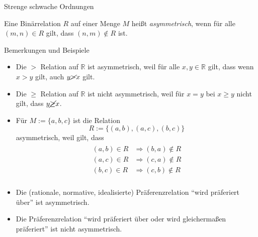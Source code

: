 \documentclass[
  8pt,
  ignorenonframetext,
]{beamer}
\providecommand{\tightlist}{%
  \setlength{\itemsep}{0pt}\setlength{\parskip}{0pt}}
\begin{document}
\begin{frame}{Strenge schwache Ordnungen}
\protect\hypertarget{strenge-schwache-ordnungen}{}
\small
\begin{definition}[Asymmetrie]
Eine Binärrelation $R$ auf einer Menge $M$ heißt \textit{asymmetrisch}, wenn
für alle $(m,n) \in R$ gilt, dass $(n,m) \notin R$ ist.
\end{definition}

\footnotesize

Bemerkungen und Beispiele

\begin{itemize}
\tightlist
\item
  Die \(>\) Relation auf \(\mathbb{R}\) ist asymmetrisch, weil für alle
  \(x,y\in \mathbb{R}\) gilt, dass wenn \(x>y\) gilt, auch
  \(y\cancel{>}x\) gilt.
\item
  Die \(\ge\) Relation auf \(\mathbb{R}\) ist nicht asymmetrisch, weil
  für \(x = y\) bei \(x\ge y\) nicht gilt, dass \(y\cancel{\ge}x\).
\item
  Für \(M := \{a,b,c\}\) ist die Relation \begin{equation}
  R := \{(a,b), (a,c), (b,c)\}
  \end{equation} asymmetrisch, weil gilt, dass \begin{align}
  \begin{split}
  (a,b) \in R & \Rightarrow (b,a) \notin R \\
  (a,c) \in R & \Rightarrow (c,a) \notin R \\
  (b,c) \in R & \Rightarrow (c,b) \notin R \\
  \end{split}
  \end{align}
\item
  Die (rationale, normative, idealisierte) Präferenzrelation ``wird
  präferiert über'' ist asymmetrisch.
\item
  Die Präferenzrelation ``wird präferiert über oder wird gleichermaßen
  präferiert'' ist nicht asymmetrisch.
\end{itemize}
\end{frame}
\end{document}
